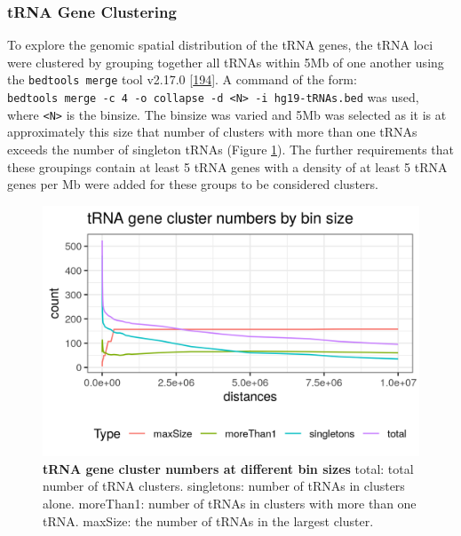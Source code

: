 \documentclass[
]{book}
\begin{document}
\hypertarget{clustering}{%
\subsubsection{tRNA Gene Clustering}\label{clustering}}

To explore the genomic spatial distribution of the tRNA genes, the tRNA loci were clustered by grouping together all tRNAs within 5Mb of one another using the \texttt{bedtools\ merge} tool v2.17.0 {[}\protect\hyperlink{ref-Quinlan2010}{194}{]}.
A command of the form: \texttt{bedtools\ merge\ -c\ 4\ -o\ collapse\ -d\ \textless{}N\textgreater{}\ -i\ hg19-tRNAs.bed} was used, where \texttt{\textless{}N\textgreater{}} is the binsize.
The binsize was varied and 5Mb was selected as it is at approximately this size that number of clusters with more than one tRNAs exceeds the number of singleton tRNAs (Figure \ref{fig:tRNAgeneClustersByBinSize}).
The further requirements that these groupings contain at least 5 tRNA genes with a density of at least 5 tRNA genes per Mb were added for these groups to be considered clusters.

\begin{figure}

{\centering \includegraphics[width=1\linewidth]{figs/tRNAgeneClustersByBinSize} 

}

\caption{\textbf{tRNA gene cluster numbers at different bin sizes} total: total number of tRNA clusters. singletons: number of tRNAs in clusters alone. moreThan1: number of tRNAs in clusters with more than one tRNA. maxSize: the number of tRNAs in the largest cluster.}\label{fig:tRNAgeneClustersByBinSize}
\end{figure}
\end{document}
